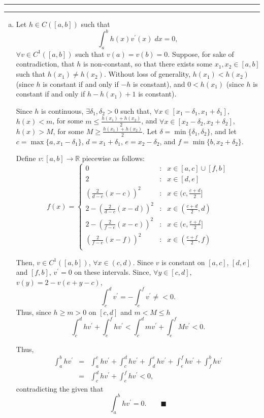 \documentclass[11pt]{article}
\newcounter{questionCounter}
\newcounter{partCounter}[questionCounter]
\newenvironment{question}[2][\arabic{questionCounter}]{%
    \setcounter{partCounter}{0}%
    \vspace{.25in} \hrule \vspace{0.5em}%
        \noindent{\bf #2}%
    \vspace{0.8em} \hrule \vspace{.10in}%
    \addtocounter{questionCounter}{1}%
}{}
\begin{document}
\begin{question}{Problem 2}
\begin{enumerate}[(a)]
\item Let $h \in C([a,b])$ such that \[\int_a^b h(x) v^{\prime}(x) \; dx = 0,\]
$\forall v \in C^1([a,b])$ such that $v(a) = v(b) = 0$. Suppose, for sake of
contradiction, that $h$ is non-constant, so that there exists some
$x_1,x_2 \in [a,b]$ such that $h(x_1) \neq h(x_2)$. Without loss of generality,
$h(x_1) < h(x_2)$ (since $h$ is constant if and only if $-h$ is constant), and
$0 < h(x_1)$ (since $h$ is constant if and only if $h - h(x_1) + 1$ is
constant).

Since $h$ is continuous, $\exists \delta_1,\delta_2 > 0$ such that,
$\forall x \in [x_1 - \delta_1, x_1 + \delta_1]$, $h(x) < m$, for some
$m \leq \frac{h(x_1) + h(x_2)} {2}$, and
$\forall x \in [x_2 - \delta_2, x_2 + \delta_2]$, $h(x) > M$, for some
$M \geq \frac{h(x_1) + h(x_2)} {2}$. Let $\delta = \min\{\delta_1,\delta_2\}$,
and let $c = \max\{a,x_1 - \delta_1\}$,
$d = x_1 + \delta_1$, $e = x_2 - \delta_2$, and
$f = \min\{b,x_2 + \delta_2\}$.

Define $v: [a,b] \rightarrow \mathbb{R}$ piecewise as follows:
\[
   f(x) = \left\{
     \begin{array}{lcr}
       0 & : & x \in [a,c] \cup [f,b] \\
       2 & : & x \in [d,e] \\
       (\frac{2}{d - c}(x - c))^2 & : & x \in (c,\frac{c + d}{2}] \\
       2 - (\frac{2}{d - c}(x - d))^2 & : & x \in (\frac{c + d}{2},d) \\
       2 - (\frac{2}{f - e}(x - e))^2 & : & x \in (e,\frac{e + f}{2}] \\
       (\frac{2}{f - e}(x - f))^2 & : & x \in (\frac{e + f}{2},f) \\
     \end{array}
   \right.
\]

Then, $v \in C^1([a,b])$, $\forall x \in (c,d)$. Since $v$ is constant on
$[a,c]$, $[d,e]$ and $[f,b]$, $v^{\prime} = 0$ on these intervals.
Since, $\forall y \in [c,d]$, $v(y) = 2 - v(e + y - c)$,
\[\int_c^d v^{\prime} = - \int_e^f v^{\prime} \neq < 0.\]
Thus, since $h \geq m > 0$ on $[c,d]$ and $m < M \leq h$
\[\int_c^d hv^{\prime} + \int_e^f hv^{\prime}
 < \int_c^d mv^{\prime} + \int_e^f Mv^{\prime} < 0.\]

Thus,
\begin{eqnarray*}
\int_a^b hv^{\prime}
 & = & \int_a^c hv^{\prime} + \int_c^d hv^{\prime}
   + \int_d^e hv^{\prime} + \int_e^f hv^{\prime} + \int_f^b hv^{\prime} \\
 & = & \int_c^d hv^{\prime} + \int_e^f hv^{\prime} < 0,
\end{eqnarray*}
contradicting the given that \[\int_a^b hv^{\prime} = 0. \qquad \blacksquare\]


\end{enumerate}
\end{question}
\end{document}
